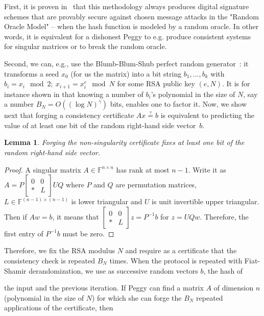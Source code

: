 \documentclass{article}
\newtheorem{lemma}{Lemma}
\newcommand{\F}{\ensuremath{\mathbb F}}
\newcommand{\bigO}[1]{\ensuremath{O(#1)}\xspace}
\begin{document}
First, it is proven in~\cite{Pointcheval:1996:provsecsign}
that this methodology always produces digital signature schemes that
are provably secure against chosen message attacks in the "Random
Oracle Model" -- when the hash function is modeled by a random
oracle. 
In other words, it is equivalent for a dishonest Peggy to e.g. produce
consistent systems for singular matrices or to break the random oracle.

Second, we can, e.g., use the Blumb-Blum-Shub perfect
random generator~\cite{Blum:1982:BBS}:
it transforms a seed $x_0$ (for us the matrix) into a bit string
$b_1,\ldots,b_k$ with $b_i=x_i \mod 2;~x_{i+1}=x_i^e\mod N$ for some
RSA public key $(e,N)$. 
It is for instance shown in \cite{Fischlin:1997:SSP} that
knowing a number of $b_i$'s polynomial in the size of $N$, say
a number $B_N=\bigO{(\log N)^\gamma}$  
bits, enables one to factor it. 
Now, we show next that forging a consistency certificate
$Ax\stackrel{?}{=}b$ is equivalent
to predicting the value of at least one bit of the random right-hand
side vector~$b$. 
\begin{lemma} 
  Forging the non-singularity certificate fixes at least one bit of the random
  right-hand side vector.
\end{lemma}
\begin{proof}
  A singular matrix $A\in\F^{n\times n}$ has rank at most $n-1$.
  Write it as
  $A=P\left[\begin{smallmatrix}0&0\\*&L\end{smallmatrix}\right]UQ$ where $P$ and $Q$
  are permutation matrices, $L\in\F^{(n-1)\times (n-1)}$ is lower
  triangular and $U$ is unit invertible upper triangular. Then if $Aw=b$, 
  it means that  
  $\left[\begin{smallmatrix}0&0\\*&L\end{smallmatrix}\right] z=P^{-1}b$ for
  $z=UQw$. Therefore, the first entry of $P^{-1}b$ must be zero.
\end{proof}

Therefore, we fix the RSA modulus $N$ and require as a certificate
that the consistency check is repeated $B_N$ times. 
When the protocol is repeated with Fiat-Shamir derandomization,
we use as successive random vectors $b$, the hash of 
 
 
the input and the previous iteration.
If Peggy can find a matrix $A$ of dimension $n$ (polynomial in the size of $N$)
for which she can forge the $B_N$ repeated applications of the certificate, then
 
\end{document}
